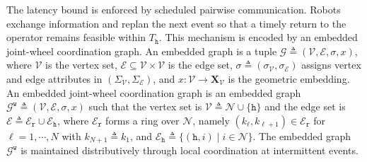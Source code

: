 The latency bound is enforced by scheduled pairwise communication. Robots
exchange information and replan the next event so that a timely return to the
operator remains feasible within $T_{\texttt{h}}$. This mechanism is encoded by
an embedded joint-wheel coordination graph.
An embedded graph is a tuple
$\mathcal{G} \triangleq (\mathcal{V}, \mathcal{E}, \sigma, x)$, where
$\mathcal{V}$ is the vertex set, $\mathcal{E} \subseteq
\mathcal{V} \times \mathcal{V}$ is the edge set,
$\sigma \triangleq (\sigma_{\mathcal{V}}, \sigma_{\mathcal{E}})$ assigns vertex
and edge attributes in $(\Sigma_{\mathcal{V}}, \Sigma_{\mathcal{E}})$, and
$x : \mathcal{V} \rightarrow \boldsymbol{X}_{\mathcal{V}}$ is the geometric
embedding.
An embedded joint-wheel coordination graph is an embedded graph
$\mathcal{G}^{\texttt{w}} \triangleq
(\mathcal{V}, \mathcal{E}, \sigma, x)$ such that the vertex set is
$\mathcal{V} \triangleq \mathcal{N} \cup \{\texttt{h}\}$ and the edge set is
$\mathcal{E} \triangleq \mathcal{E}_{\texttt{r}} \cup
\mathcal{E}_{\texttt{h}}$, where $\mathcal{E}_{\texttt{r}}$ forms a ring over
$\mathcal{N}$, namely
$(k_\ell, k_{\ell+1}) \in \mathcal{E}_{\texttt{r}}$ for
$\ell = 1,\cdots,N$ with $k_{N+1} \triangleq k_1$, and
$\mathcal{E}_{\texttt{h}} \triangleq
\{(\texttt{h}, i) \mid i \in \mathcal{N}\}$.
 The embedded graph
$\mathcal{G}^{\texttt{w}}$ is maintained distributively through local
coordination at intermittent events.

